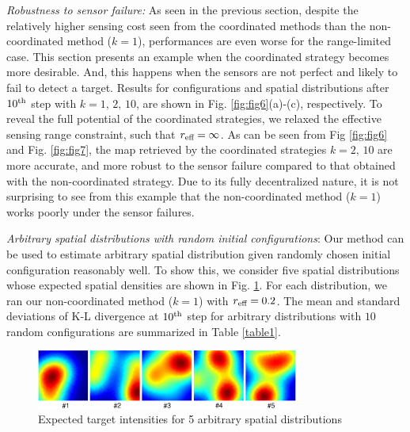 \documentclass[letterpaper, 10 pt, conference]{ieeeconf}
\begin{document}
\textit{Robustness to sensor failure:}
As seen in the previous section, 
despite the relatively higher sensing cost seen from the coordinated methods than the non-coordinated method ($k=1$), performances are even worse for the range-limited case.
This section presents an example when the coordinated strategy becomes more desirable. And, this happens when the sensors are not perfect and likely to fail to detect a target. 
Results for configurations and spatial distributions after $10^{\textup{th}}$ step with $k=1,\,2,\,10$, are shown in Fig. \ref{fig:fig6}(a)-(c), respectively. To reveal the full potential of the coordinated strategies, we relaxed the effective sensing range constraint, such that $r_{\textup{eff}} = \infty$.
As can be seen from Fig \ref{fig:fig6} and Fig. \ref{fig:fig7}, the map retrieved by the coordinated strategies $k=2,\,10$ are more accurate, and more robust to the sensor failure compared to that obtained with the non-coordinated strategy. 
Due to its fully decentralized nature, it is not surprising to see from this example that the non-coordinated method ($k=1$) works poorly under the sensor failures. 

\textit{Arbitrary spatial distributions with random initial configurations}:
Our method can be used to estimate arbitrary spatial distribution given randomly chosen initial configuration reasonably well. To show this, we consider five spatial distributions whose expected spatial densities are shown in Fig. \ref{fig:fig8}. 
For each distribution, we ran our non-coordinated method ($k=1$) with $r_{\textup{eff}} = 0.2$. The mean and standard deviations of K-L divergence at $10^{\textup{th}}$ step for arbitrary distributions with $10$ random configurations are summarized in Table \ref{table1}.
\begin{figure}
	\centering
	\includegraphics[width=3.4in]{figure/fig8}
	\caption{Expected target intensities for 5 arbitrary spatial distributions} 
	\label{fig:fig8}
\end{figure}

\begin{table}[]
	\centering
	\caption{Mean and standard deviations (parenthesis) of K-L divergence for  arbitrary distributions (Fig. \ref{fig:fig8}) under 10 random initial configurations}
	\label{table1}
			{\scriptsize
	}
\end{table}
\end{document}

